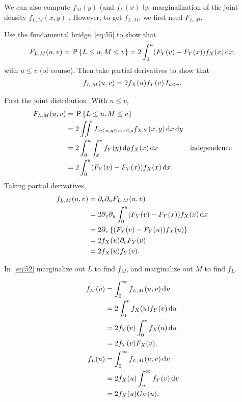 \documentclass[a4paper,11pt]{article}
\begin{document}
We can also compute $f_{M}(y)$ (and $f_{L}(x)$ by marginalization of the joint density $f_{L,M}(x,y)$ .
However, to get $f_{L,M}$, we first need $F_{L,M}$.
\begin{exercise}
Use the fundamental bridge~\cref{eq:55} to show that
\begin{equation*}
  F_{L,M}(u,v) = \,\mathsf{P}\left\{L\leq u, M\leq v\right\} = 2\int_0^u (F_Y(v)- F_Y(x)) f_X(x) \,\textrm{d}x, 
\end{equation*}
with $u\leq v$ (of course). Then take partial derivatives to show that
\begin{align}
  \label{eq:52}
f_{L,M}(u,v) = 2f_X(u) f_Y(v)\,I_{u\leq v}.
\end{align}

\begin{solution}
First the joint distribution. With $u\leq v$,
  \begin{align}
    \label{eq:51}
F_{L,M}(u,v) &= \,\mathsf{P}\left\{L\leq u, M \leq v\right\} \\
&= 2\iint \,I_{x \leq u, y\leq v, x\leq y} f_{X,Y}(x,y)\,\textrm{d}x \,\textrm{d}y \\
&= 2\int_0^u \int_x^v f_Y(y) \,\textrm{d}y f_X(x) \,\textrm{d}x & \text{independence} \\
&= 2\int_0^u (F_Y(v)- F_Y(x)) f_X(x) \,\textrm{d}x. 
  \end{align}
Taking partial derivatives,
\begin{align}
f_{L,M}(u,v) 
&=\partial_v\partial_{u}F_{L,M}(u,v) \\  
&=2 \partial_v\partial_{u} \int_0^u (F_Y(v)- F_Y(x)) f_X(x) \,\textrm{d}x  \\
&=2 \partial_v \left\{(F_Y(v)- F_Y(u)) f_X(u) \right \}  \\
&=2 f_X(u)\partial_v F_Y(v)  \\
&=2 f_X(u)f_Y(v).
\end{align}
\end{solution}
\end{exercise}

\begin{exercise}
In~\cref{eq:52} marginalize out $L$ to find $f_M$, and marginalize out $M$ to find $f_L$.
\begin{solution}
\begin{align}
  \label{eq:54}
  f_M(v) &=  \int_0^{\infty} f_{L,M}(u,v) \,\textrm{d}u \\
&= 2 \int_0^{v} f_{X}(u) f_Y(v) \,\textrm{d}u \\
&= 2 f_Y(v) \int_0^{v} f_{X}(u) \,\textrm{d}u  \\
&= 2f_Y(v) F_X(v), \\
f_L(u) &=  \int_0^{\infty} f_{L,M}(u,v) \,\textrm{d}v \\
&= 2 f_{X}(u) \int_u^{\infty} f_Y(v) \,\textrm{d}v \\
&= 2 f_{X}(u) G_{Y}(u).
\end{align}
\end{solution}
\end{exercise}
\end{document}
